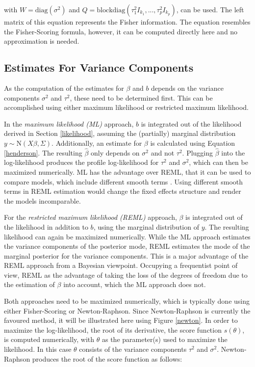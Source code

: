\documentclass[12pt]{article}
\begin{document}
 with $W=\text{diag}(\sigma^2)$ and $Q=\text{blockdiag}(\tau_1^2I_{k_1},..., \tau_p^2I_{k_p})$, can be used. The left matrix of this equation represents the Fisher information. The equation resembles the Fisher-Scoring formula, however, it can be computed directly here and no approximation is needed.
 
 \subsection{Estimates For Variance Components}\label{varianceestimates}

As the computation of the estimates for $\beta$ and $b$ depends on the variance components $\sigma^2$ and $\tau^2$, these need to be determined first. This can be accomplished using either maximum likelihood or restricted maximum likelihood. 

In the \textit{maximum likelihood (ML)} approach, $b$ is integrated out of the likelihood derived in Section \ref{likelihood}, assuming the (partially) marginal distribution $y \sim \mathrm{N}(X\beta,\Sigma)$. Additionally, an estimate for $\beta$ is calculated using Equation \ref{henderson}. The resulting $\hat{\beta}$ only depends on $\sigma^2$ and not $\tau^2$. Plugging $\hat{\beta}$ into the log-likelihood  produces the profile log-likelihood for $\tau^2$ and $\sigma^2$, which can then be maximized numerically. ML has the advantage over REML, that it can be used to compare models, which include different smooth terms \cite{wood2011fast}. Using different smooth terms in REML estimation would change the fixed effects structure and render the models incomparable.

For the \textit{restricted maximum likelihood (REML)} approach, $\beta$ is integrated out of the likelihood in addition to $b$, using the marginal distribution of $y$. The resulting likelihood can again be maximized numerically.
While the ML approach estimates the variance components of the posterior mode, REML estimates the mode of the marginal posterior for the variance components. This is a major advantage of the REML approach from a Bayesian viewpoint. Occupying a frequentist point of view, REML as the advantage of taking the loss of the degrees of freedom due to the estimation of $\beta$ into account, which the ML approach does not.

Both approaches need to be maximized numerically, which is typically done using either Fisher-Scoring or Newton-Raphson. Since Newton-Raphson is currently the favoured method, it will be illustrated here using Figure \ref{newton}. In order to maximize the log-likelihood, the root of its derivative, the score function $s(\theta)$, is computed numerically, with $\theta$ as the parameter(s) used to maximize the likelihood. In this case $\theta$ consists of the variance components $\tau^2$ and $\sigma^2$. 
Newton-Raphson produces the root of the score function as follows:
\end{document}

